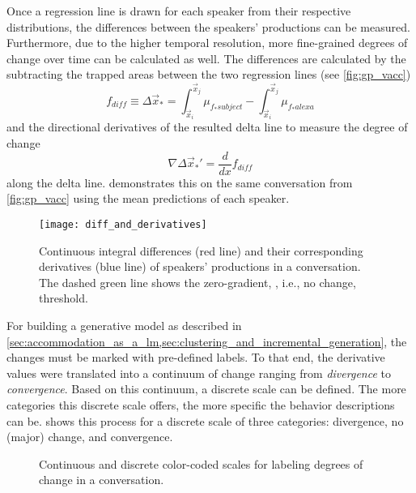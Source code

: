 Once a regression line is drawn for each speaker from their respective distributions, the differences between the speakers' productions can be measured.
Furthermore, due to the higher temporal resolution, more fine-grained degrees of change over time can be calculated as well.
The differences are calculated by the subtracting the trapped areas between the two regression lines (see \cref{fig:gp_vacc})
%
\begin{equation}
	f_{diff} \equiv\Delta\vec{x}_* =
	\int_{\vec{x}_i}^{\vec{x}_{j}}\mu_{f_*subject} -
	\int_{\vec{x}_i}^{\vec{x}_{j}}\mu_{f_*alexa}
\end{equation}
%
and the directional derivatives of the resulted delta line to measure the degree of change
%
\begin{equation}
	\nabla\Delta\vec{x}_*' = \frac{d}{dx}f_{diff}
\end{equation}
%
along the delta line.
 demonstrates this on the same conversation from \cref{fig:gp_vacc} using the mean predictions of each speaker.
%
\begin{figure}[t]
	\centering
	\texttt{[image: diff\_and\_derivatives]}
	\caption[Continuous integral differences and derivatives in a \acl{hci}]
		{Continuous integral differences (red line) and their corresponding derivatives (blue line) of speakers' productions in a conversation.
		 The dashed green line shows the zero-gradient, , i.e., no change, threshold.}
	\label{fig:diff_and_derivatives}
\end{figure}
%
For building a generative model as described in \cref{sec:accommodation_as_a_lm,sec:clustering_and_incremental_generation}, the changes must be marked with pre-defined labels.
To that end, the derivative values were translated into a continuum of change ranging from \textit{divergence} to \textit{convergence}.
Based on this continuum, a discrete scale can be defined.
The more categories this discrete scale offers, the more specific the behavior descriptions can be.
 shows this process for a discrete scale of three categories: divergence, no (major) change, and convergence.
%
\begin{figure}[t]
	\centering
	\hfill
	\caption[Continuous and discrete scales for labeling degrees of change]
		{Continuous and discrete color-coded scales for labeling degrees of change in a conversation.}
	\label{fig:cont_disc_scales}
\end{figure}

